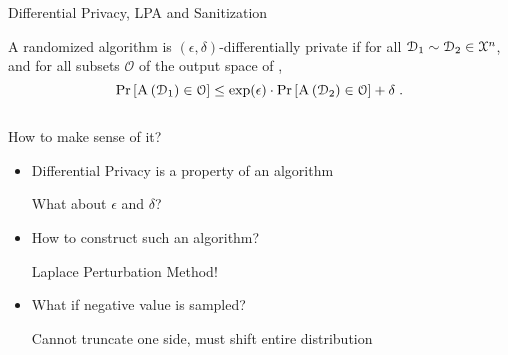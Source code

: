 	\begin{frame}{Differential Privacy, LPA and Sanitization}

		\begin{definition}
			\justify%

			A randomized algorithm  is $(\epsilon, \delta)$-differentially private if for all $\mathcal{D}_1 \sim \mathcal{D}_2 \in \mathcal{X}^{n}$, and for all subsets $\mathcal{O}$ of the output space of ,
			\[
				\probability{ \algo{A}{ \database_1 } \in \mathcal{O} } \leq \exp(\epsilon) \cdot \probability{ \algo{A}{ \database_2 } \in \mathcal{O} } + \delta \; .
			\]
		\end{definition}

		\pause%

		\begin{columns}[T,onlytextwidth]

				\begin{block}{How to make sense of it?}
					\begin{itemize}
						\item<2->
							Differential Privacy is a property of an algorithm \\
							\begin{small}
								What about $\epsilon$ and $\delta$?
							\end{small}
						\item<3->
							How to construct such an algorithm? \\
							\begin{small}
								Laplace Perturbation Method!
							\end{small}
						\item<4->
							What if negative value is sampled? \\
							\begin{small}
								Cannot truncate one side, must shift entire distribution
							\end{small}
					\end{itemize}
				\end{block}



		\end{columns}

	\end{frame}

